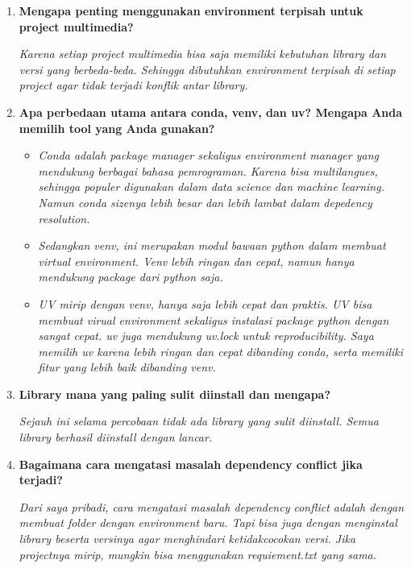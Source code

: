 \documentclass[11pt,a4paper]{article}
\begin{document}
\begin{enumerate}
    \item \textbf{Mengapa penting menggunakan environment terpisah untuk project multimedia?}
    
    \textit{Karena setiap project multimedia bisa saja memiliki kebutuhan library dan versi yang berbeda-beda. Sehingga dibutuhkan environment terpisah di setiap project agar tidak terjadi konflik antar library.}
    
    \item \textbf{Apa perbedaan utama antara conda, venv, dan uv? Mengapa Anda memilih tool yang Anda gunakan?}
    \begin{itemize} 
        \item \textit{Conda adalah package manager sekaligus environment manager yang mendukung berbagai bahasa pemrograman. Karena bisa multilangues, sehingga populer digunakan dalam data science dan machine learning. Namun conda sizenya lebih besar dan lebih lambat dalam depedency resolution.}
        \item \textit{Sedangkan venv, ini merupakan modul bawaan python dalam membuat virtual environment. Venv lebih ringan dan cepat, namun hanya mendukung package dari python saja.}
        \item \textit{UV mirip dengan venv, hanya saja lebih cepat dan praktis. UV bisa membuat virual environment sekaligus instalasi package python dengan sangat cepat. uv juga mendukung uv.lock untuk reproducibility. Saya memilih uv karena lebih ringan dan cepat dibanding conda, serta memiliki fitur yang lebih baik dibanding venv.}
    \end{itemize}
    
    \item \textbf{Library mana yang paling sulit diinstall dan mengapa?}
    
    \textit{Sejauh ini selama percobaan tidak ada library yang sulit diinstall. Semua library berhasil diinstall dengan lancar.}
    
    \item \textbf{Bagaimana cara mengatasi masalah dependency conflict jika terjadi?}
    
    \textit{Dari saya pribadi, cara mengatasi masalah dependency conflict adalah dengan membuat folder dengan environment baru. Tapi bisa juga dengan menginstal library beserta versinya agar menghindari ketidakcocokan versi. Jika projectnya mirip, mungkin bisa menggunakan requiement.txt yang sama.}
    

\end{enumerate}
\end{document}
